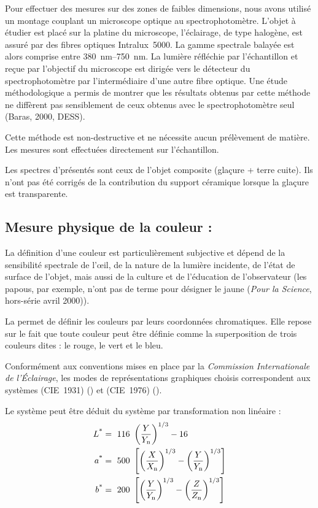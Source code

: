 Pour effectuer des mesures sur des zones de faibles dimensions, 
nous avons utilisé un montage couplant un microscope optique au 
spectrophotomètre. L'objet à étudier est placé sur la platine du 
microscope, l'éclairage, de type halogène, est assuré par des fibres 
optiques Intralux~5000. La gamme spectrale balayée est alors comprise 
entre \SIrange[range-phrase=\ et\ ]{380}{750}{\nm}. La lumière 
réfléchie par l'échantillon et reçue par l'objectif du microscope est 
dirigée vers le détecteur du spectrophotomètre par l'intermédiaire 
d'une autre fibre optique. Une étude méthodologique a permis de 
montrer que les résultats obtenus par cette méthode ne diffèrent pas 
sensiblement de ceux obtenus avec le spectrophotomètre seul (Baras, 
2000, DESS).

Cette méthode est non-destructive et ne nécessite aucun prélèvement de 
matière. Les mesures sont effectuées directement sur l'échantillon.

Les spectres d'\AO présentés sont ceux de l'objet composite (glaçure + 
terre cuite). Ils n'ont pas été corrigés de la contribution du support 
céramique lorsque la glaçure est transparente.

\subsection[Chromamétrie]{Mesure physique de la couleur : \CHRO}
La définition d'une couleur est particulièrement subjective et dépend 
de la sensibilité spectrale de l'{\oe}il, de la nature de la lumière 
incidente, de l'état de surface de l'objet, mais aussi de la culture 
et de l'éducation de l'observateur (les papous, par exemple, n'ont pas 
de terme pour désigner le jaune (\textit{Pour la Science}, hors-série 
avril 2000)).

La \CHRO permet de définir les couleurs par leurs
coordonnées chromatiques. Elle repose sur le fait que toute couleur
peut être définie comme la superposition de trois couleurs dites
 : le rouge, le vert et le bleu.

Conformément aux conventions mises en place par la \emph{Commission 
Internationale de l'Éclairage}, les modes de représentations 
graphiques choisis correspondent aux systèmes \Yxy (CIE~1931) 
() et \Lab (CIE~1976) ().

Le système \Lab peut être déduit du système \Yxy par transformation 
non linéaire :
\begin{align}
  \CIEL & =\ 116\ \left(\frac{Y}{\Yn}\right)^{1/3} - 16 \\
%
  \CIEa & =\ 500\ \left[%
      \left(\frac{X}{\Xn}\right)^{1/3} - %
      \left(\frac{Y}{\Yn}\right)^{1/3}%
    \right] \\
%
  \CIEb & =\ 200\ \left[%
      \left(\frac{Y}{\Yn}\right)^{1/3} - %
      \left(\frac{Z}{\Zn}\right)^{1/3}%
    \right]
\end{align}

